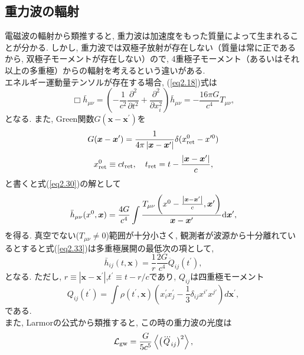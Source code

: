 \subsection{重力波の輻射}
電磁波の輻射から類推すると, 重力波は加速度をもった質量によって生まれることが分かる. しかし, 重力波では双極子放射が存在しない（質量は常に正であるから, 双極子モーメントが存在しない）ので, 4重極子モーメント（あるいはそれ以上の多重極）からの輻射を考えるという違いがある. \\
\quad エネルギー運動量テンソルが存在する場合, (\ref{eq2.18})式は
\begin{equation}
\Box\bar{h}_{\mu\nu}=\left(-\frac{1}{c^2}\frac{\partial^2}{\partial t^2}+\frac{\partial^2}{\partial x_i^2}\right)\bar{h}_{\mu\nu}=-\frac{16\pi G}{c^4}T_{\mu\nu},
\label{eq2.30}
\end{equation}
となる. また, Green関数$G(\bm{x}-\bm{x}^{\prime})$を
\begin{equation}
G(\bm{x}-\bm{x}^{\prime})=\frac{1}{4\pi\left|\bm{x}-\bm{x}^{\prime}\right|}\delta(x^0_{\rm ret}-x^{\prime0})
\end{equation}
\begin{equation}
x_{\rm ret}^0\equiv ct_{\rm ret},\quad t_{\rm ret}=t-\frac{\left|\bm{x}-\bm{x}^{\prime}\right|}{c},
\end{equation}
と書くと式(\ref{eq2.30})の解として
\begin{equation}
\bar{h}_{\mu\nu}(x^0,\bm{x})=\frac{4G}{c^4}\int\frac{T_{\mu\nu}\left(x^0-\frac{\left|\bm{x}-\bm{x}^{\prime}\right|}{c},\bm{x}^{\prime}\right)}{\bm{x}-\bm{x}^{\prime}}{\rm d}\bm{x}^{\prime},
\label{eq2.33}
\end{equation}
を得る. 真空でない($T_{\mu\nu}\neq0$)範囲が十分小さく, 観測者が波源から十分離れているとすると式(\ref{eq2.33})は多重極展開の最低次の項として, 
\begin{equation}
\bar{h}_{ij}(t,\bm{x})=\frac{1}{r}\frac{2G}{c^4}\ddot{Q}_{ij}(t^{\prime}),
\label{eq2.34}
\end{equation}
となる. ただし, $r\equiv\left|\bm{x}-\bm{x}^{\prime}\right|$,$t^{\prime}\equiv t-r/c$であり, $Q_{ij}$は四重極モーメント
\begin{equation}
Q_{ij}(t^{\prime})=\int\rho(t^{\prime},\bm{x})\left(x_{i}^{\prime}x_{j}^{\prime}-\frac{1}{3}\delta_{ij}x^{i\prime}x^{j\prime}\right)d\bm{x}^{\prime},
\end{equation}
である.  \\
\quad また, Larmorの公式から類推すると, この時の重力波の光度は
\begin{equation}
\mathcal{L}_{\rm gw}=\frac{G}{5c^5}\left<\left(\dddot{Q}_{ij}\right)^2\right>,
\label{eq2.36}
\end{equation}

